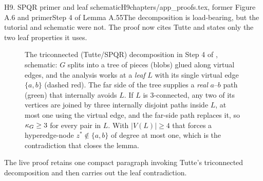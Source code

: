 \begin{offcutrewrite}{H9. SPQR primer and leaf schematic}{H9}{chapters/app\_proofs.tex, former Figure A.6 and primer}{Step 4 of Lemma A.55}{The decomposition is load-bearing, but the tutorial and schematic were not. The proof now cites Tutte and states only the two leaf properties it uses.}
\begin{figure}[htbp]
\centering
{}
\caption[Tutte leaf analysis]{The triconnected (Tutte/SPQR) decomposition in
Step 4 of , schematic: $G$ splits into a tree of
pieces (blobs) glued along virtual edges, and the analysis works at a
\emph{leaf} $L$ with its single virtual edge $\{a,b\}$ (dashed red). The far
side of the tree supplies a \emph{real} $a$--$b$ path (green) that internally
avoids $L$. If $L$ is $3$-connected, any two of its vertices are joined by
three internally disjoint paths inside $L$, at most one using the virtual
edge, and the far-side path replaces it, so $\kappa_G\ge3$ for every pair in
$L$. With $|V(L)|\ge4$ that forces a hyperedge-node $z^*\notin\{a,b\}$ of
degree at most one, which is the contradiction that closes the lemma.}
\label{fig:tutte-leaf}
\end{figure}
\nowreads
The live proof retains one compact paragraph invoking Tutte's triconnected decomposition and then carries out the leaf contradiction.
\end{offcutrewrite}

